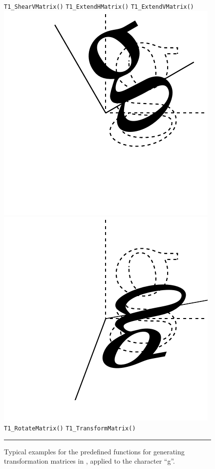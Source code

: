 \begin{figure}[t]
\hfill\break
\noindent\vrule width 0pt\hfill\verb+T1_ShearVMatrix()+\hfill
\verb+T1_ExtendHMatrix()+\hfill
\verb+T1_ExtendVMatrix()+\hfill\break
\vskip0.5cm
\hfill
\includegraphics[scale=0.5]{rotate}
\hfill
\includegraphics[scale=0.5]{arbitrary}
\hfill\break
\noindent\vrule width 0pt\hfill\verb+T1_RotateMatrix()+\hfill
\verb+T1_TransformMatrix()+\hfill\break
\vskip3mm
\hrule\vskip3mm\small
\caption{\label{figure:transformations}Typical examples for the predefined
  functions for generating transformation matrices in \tonelib, applied to the
  character ``g''.} 
\end{figure}

